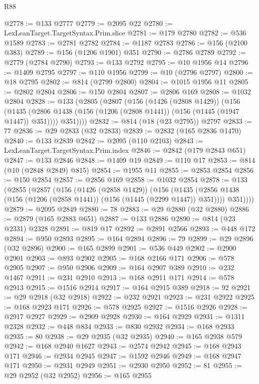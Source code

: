 \begin{lexlean}{R88}
\begin{coremodule}
@2778 := @133 @2777
@2779 := @2095 @22
@2780 := LexLeanTarget.TargetSyntax.Prim.slice
@2781 := @179 @2780
@2782 := @536 @1589
@2783 := @2781 @2782
@2784 := @1187 @2783
@2786 := @156 (@2100 @383)
@2789 := @156 (@1206 @1901) @351
@2790 := @2786 @2789
@2792 := @2779 (@2784 @2790)
@2793 := @133 @2792
@2795 := @10 @1956 @14
@2796 := @1409 @2795
@2797 := @110 @1956
@2799 := @10 (@2796 @2797)
@2800 := @18 @2795
@2802 := @814 (@2799 @2800)
@2804 := @1015 @1956 @11
@2805 := @2802 @2804
@2806 := @150 @2804
@2807 := @2806 @169
@2808 := @1032 @2804
@2828 := @133
    (@2805
      (@2807
        (@156
          (@1426 (@2808 @1429))
          (@156
            (@1435 (@2806 @1438 (@156 (@1206 (@2808 @1441)) (@156 (@1445 (@1947 @1447)) @351))))
            @351))))
@2832 := @814 (@18 (@23 @2795)) @2797
@2833 := 77
@2836 := @29 @2833 (@32 @2833)
@2839 := @2832 (@165 @2836 @1470)
@2840 := @133 @2839
@2842 := @2095 (@110 @2103)
@2843 := LexLeanTarget.TargetSyntax.Prim.index
@2846 := @2842 (@179 @2843 @651)
@2847 := @133 @2846
@2848 := @1409 @19
@2849 := @110 @17
@2853 := @814 (@10 (@2848 @2849) @815)
@2854 := @1955 @11
@2855 := @2853 @2854
@2856 := @150 @2854
@2857 := @2856 @169
@2858 := @1032 @2854
@2878 := @133
    (@2855
      (@2857
        (@156
          (@1426 (@2858 @1429))
          (@156
            (@1435 (@2856 @1438 (@156 (@1206 (@2858 @1441)) (@156 (@1445 (@2299 @1447)) @351))))
            @351))))
@2879 := @2095 @2849
@2880 := 78
@2883 := @29 @2880 (@32 @2880)
@2886 := @2879 (@165 @2883 @651)
@2887 := @133 @2886
@2890 := @814 (@23 @2331) @2328
@2891 := @819 @17
@2892 := @2891 @2566
@2893 := @448 @172
@2894 := @950 @2893
@2895 := @164 @2894
@2896 := 79
@2899 := @29 @2896 (@32 @2896)
@2900 := @165 @2899
@2901 := @536 @449
@2902 := @2900 @2901
@2903 := @893 @2902
@2905 := @168 @2166 @171
@2906 := @578 @2905
@2907 := @950 @2906
@2909 := @164 @2907 @389
@2910 := @232 @1467
@2911 := @231 @2910
@2913 := @168 @2911 @171
@2914 := @578 @2913
@2915 := @1516 @2914
@2917 := @164 @2915 @389
@2918 := 92
@2921 := @29 @2918 (@32 @2918)
@2922 := @232 @2921
@2923 := @231 @2922
@2925 := @168 @2923 @171
@2926 := @578 @2925
@2927 := @1516 @2926
@2928 := @2917 @2927
@2929 := @2909 @2928
@2930 := @164 @2929
@2931 := @1311 @2328
@2932 := @448 @834
@2933 := @830 @2932
@2934 := @168 @2933
@2935 := 80
@2938 := @29 @2935 (@32 @2935)
@2940 := @165 @2938 @579
@2942 := @168 @2940 @1627
@2943 := @2574 @2942
@2945 := @168 @2943 @171
@2946 := @2934 @2945
@2947 := @1592 @2946
@2949 := @168 @2947 @171
@2950 := @2931 @2949
@2951 := @2930 @2950
@2952 := 81
@2955 := @29 @2952 (@32 @2952)
@2956 := @165 @2955

\end{coremodule}
\end{lexlean}
